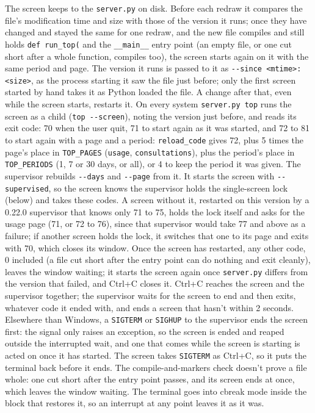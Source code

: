 \documentclass[10pt,a4paper]{article}
\newcommand{\code}[1]{\texttt{#1}}
\begin{document}
The screen keeps to the \code{server.py} on disk. Before each redraw it compares the file's
modification time and size with those of the version it runs; once they have changed and stayed
the same for one redraw, and the new file compiles and still holds \code{def run\_top(} and the
\code{\_\_main\_\_} entry point (an empty file, or one cut short after a whole function, compiles too),
the screen starts again on it with the same period and page. The version it runs is passed to it as
\code{-{}-since <mtime>:<size>}, as the process starting it saw the file just before; only the first
screen started by hand takes it as Python loaded the file. A change after that, even while the
screen starts, restarts it. On every system \code{server.py top} runs the screen
as a child (\code{top -{}-screen}), noting the version just before, and reads its exit code: 70
when the user quit, 71 to start again as it was started, and 72 to 81 to start again with a page and
a period: \code{reload\_code} gives 72, plus 5 times the page's place in \code{TOP\_PAGES} (\code{usage},
\code{consultations}), plus the period's place in \code{TOP\_PERIODS} (1, 7 or 30 days, or all), or 4
to keep the period it was given. The supervisor rebuilds \code{-{}-days} and \code{-{}-page} from it. It starts the screen with \code{-{}-supervised}, so the screen knows the supervisor holds the single-screen lock (below) and takes these codes. A screen without it, restarted on this version by a 0.22.0 supervisor that knows only 71 to 75, holds the lock itself and asks for the usage page (71, or 72 to 76), since that supervisor would take 77 and above as a failure; if another screen holds the lock, it switches that one to its page and exits with 70, which closes its window. Once the screen has restarted, any
other code, 0 included (a file cut short after the entry point can do nothing and exit cleanly),
leaves the window waiting; it starts the screen again once \code{server.py} differs from the
version that failed, and Ctrl+C closes it. Ctrl+C reaches the screen and the supervisor
together; the supervisor waits for the screen to end and then exits, whatever code it ended with,
and ends a screen that hasn't within 2 seconds. Elsewhere than Windows, a \code{SIGTERM} or
\code{SIGHUP} to the supervisor ends the screen first: the signal only raises an exception, so the
screen is ended and reaped outside the interrupted wait, and one that comes while the screen is
starting is acted on once it has started. The screen takes \code{SIGTERM} as Ctrl+C, so it puts the
terminal back before it ends. The compile-and-markers check doesn't prove a file whole: one cut short after the entry
point passes, and its screen ends at once, which leaves the window waiting. The terminal goes into cbreak
mode inside the block that restores it, so an interrupt at any point leaves it as it was.
\end{document}
